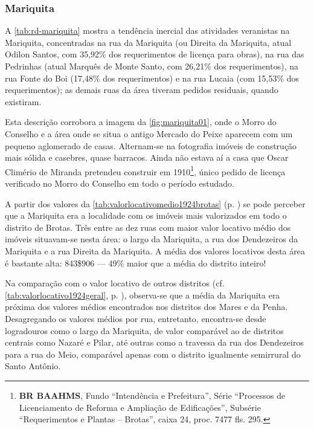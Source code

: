 \subsubsection{Mariquita}


A \autoref{tab:rd-mariquita} mostra a tendência inercial das atividades veranistas na Mariquita, concentradas na rua da Mariquita (ou Direita da Mariquita, atual Odilon Santos, com 35,92\% dos requerimentos de licença para obras), na rua das Pedrinhas (atual Marquês de Monte Santo, com 26,21\% dos requerimentos), na rua Fonte do Boi (17,48\% dos requerimentos) e na rua Lucaia (com 15,53\% dos requerimentos); as demais ruas da área tiveram pedidos residuais, quando existiram.





Esta descrição corrobora a imagem da \autoref{fig:mariquita01}, onde o Morro do Conselho e a área onde se situa o antigo Mercado do Peixe aparecem com um pequeno aglomerado de casas. Alternam-se na fotografia imóveis de construção mais sólida e casebres, quase barracos. Ainda não estava aí a casa que Oscar Climério de Miranda pretendeu construir em 1910\footnote{\textbf{BR BAAHMS}, Fundo ``Intendência e Prefeitura'', Série ``Processos de Licenciamento de Reforma e Ampliação de Edificações'', Subsérie ``Requerimentos e Plantas -- Brotas'', caixa 24, proc. 7477 fls. 295.}, único pedido de licença verificado no Morro do Conselho em todo o período estudado.


A partir dos valores da \autoref{tab:valorlocativomedio1924brotas} (p. \pageref{tab:valorlocativomedio1924brotas}) se pode perceber que a Mariquita era a localidade com os imóveis mais valorizados em todo o distrito de Brotas. Três entre as dez ruas com maior valor locativo médio dos imóveis situavam-se nesta área: o largo da Mariquita, a rua dos Dendezeiros da Mariquita e a rua Direita da Mariquita. A média dos valores locativos desta área é bastante alta: 843\$906 --- 49\% maior que a média do distrito inteiro! 

Na comparação com o valor locativo de outros distritos (cf. \autoref{tab:valorlocativo1924geral}, p. \pageref{tab:valorlocativo1924geral}), observa-se que a média da Mariquita era próxima dos valores médios encontrados nos distritos dos Mares e da Penha. Desagregando os valores médios por rua, entretanto, encontra-se desde logradouros como o largo da Mariquita, de valor comparável ao de distritos centrais como Nazaré e Pilar, até outras como a travessa da rua dos Dendezeiros para a rua do Meio, comparável apenas com o distrito igualmente semirrural do Santo Antônio.

